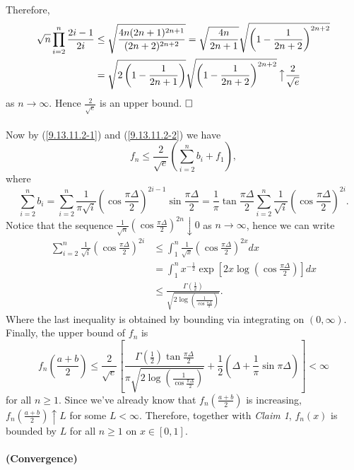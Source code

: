 \documentclass[12pt]{extarticle}
\begin{document}
\begin{enumerate}
\[\]
Therefore,
\begin{equation}
\begin{aligned}
\sqrt{n}\prod_{i=2}^n\frac{2i-1}{2i}&\leq\sqrt{\frac{4n(2n+1)^{2n+1}}{(2n+2)^{2n+2}}}=\sqrt{\frac{4n}{2n+1}}\sqrt{\left(1-\frac{1}{2n+2}\right)^{2n+2}}
\\&
=\sqrt{2\left(1-\frac{1}{2n+1}\right)}\sqrt{\left(1-\frac{1}{2n+2}\right)^{2n+2}}
\,\big\uparrow
\frac{2}{\sqrt{e}}
\end{aligned}
\label{9.13.11.2-2}
\end{equation}
as $n\rightarrow\infty$. Hence $\frac{2}{\sqrt{e}}$ is an upper bound.
$\hspace{\fill}\square$
\\
\\
Now by (\ref{9.13.11.2-1}) and (\ref{9.13.11.2-2}) we have
\[
f_n\leq\frac{2}{\sqrt{e}}\left(\sum_{i=2}^nb_i+f_1\right),
\]
where
\[
\sum_{i=2}^nb_i=\sum_{i=2}^n\frac{1}{\pi\sqrt{i}}\left(\cos\frac{\pi\Delta}{2}\right)^{2i-1}\sin\frac{\pi\Delta}{2}
=
\frac{1}{\pi}\tan\frac{\pi\Delta}{2}\sum_{i=2}^n\frac{1}{\sqrt{i}}\left(\cos\frac{\pi\Delta}{2}\right)^{2i}.
\]
Notice that the sequence $\frac{1}{\sqrt{n}}\left(\cos\frac{\pi\Delta}{2}\right)^{2n}\downarrow 0$ as $n\rightarrow\infty$, hence we can write
\[
\begin{aligned}
\sum_{i=2}^n\frac{1}{\sqrt{i}}\left(\cos\frac{\pi\Delta}{2}\right)^{2i}
&\leq
\int_1^n \frac{1}{\sqrt{x}}\left(\cos\frac{\pi\Delta}{2}\right)^{2x}dx
\\&=
\int_1^n x^{-\frac{1}{2}}\exp\left[2x\log\left(\cos\frac{\pi\Delta}{2}\right)\right]dx
\\&\leq
\frac{\Gamma\left(\frac{1}{2}\right)}{\sqrt{2\log\left(\frac{1}{\cos\frac{\pi\Delta}{2}}\right)}}.
\end{aligned}
\]
Where the last inequality is obtained by bounding via integrating on $(0,\infty)$. Finally, the upper bound of $f_n$ is
\[
f_n\left(\frac{a+b}{2}\right)\leq\frac{2}{\sqrt{e}}
\left[
\frac{\Gamma\left(\frac{1}{2}\right)\tan\frac{\pi\Delta}{2}}{\pi\sqrt{2\log\left(\frac{1}{\cos\frac{\pi\Delta}{2}}\right)}}
+\frac{1}{2}\left(\Delta+\frac{1}{\pi}\sin\pi\Delta\right)
\right]<\infty
\]
for all $n\geq 1$. Since we've already know that $f_n(\frac{a+b}{2})$ is increasing, $f_n\left(\frac{a+b}{2}\right)\uparrow L$ for some $L<\infty$. Therefore, together with \textit{Claim 1}, $f_n(x)$ is bounded by $L$ for all $n\geq 1$ on $x\in[0,1]$. 
\\
\\
\textbf{(Convergence)}


\end{enumerate}
\end{document}
